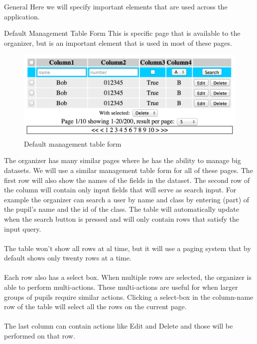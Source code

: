 \begin{section}{General}
	Here we will specify important elements that are used across the application.
	\begin{subsection}{Default Management Table Form}
		This is specific page that is available to the organizer, but is an important
		element that is used in most of these pages.
		\begin{figure}[h]
		  \centering
			\includegraphics[width=1\textwidth]{img/default_managment_form.png}
		  \caption{Default management table form}
		  \label{default_management_table_form}
		\end{figure}
		The organizer has many similar pages where he has the ability to manage big datasets.
		We will use a similar management table form for all of these pages.
		The first row will also show the names of the fields in the dataset.
		The second row of the column will contain only input fields that will serve as
		search input. For example the organizer can search a user by name and class by
		entering (part) of the pupil's name and the id of the class. The table will
		automatically update when the search button is pressed and will only contain
		rows that satisfy the input query.
		\\
		\\
		The table won't show all rows at al time, but it will use a paging system that
		by default shows only twenty rows at a time.\\
		\\
		Each row also has a select box. When multiple rows are selected, the organizer is
		able to perform multi-actions.
		These multi-actions are useful for when larger groups of pupils require similar
		actions. Clicking a select-box in the column-name row of the table will select
		all the rows on the current page.\\
		\\
		The last column can contain actions like Edit and Delete and those will be
		performed on that row.
	\end{subsection}
\end{section}